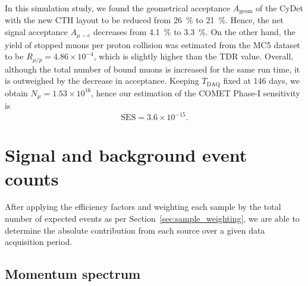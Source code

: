 In this simulation study, we found the geometrical acceptance $A_\mathrm{geom}$
of the CyDet with the new CTH layout to be reduced from \SI{26}{\percent} to
\SI{21}{\percent}. Hence, the net signal acceptance $A_{\mu-e}$ decreases from
\SI{4.1}{\percent} to \SI{3.3}{\percent}. On the other hand, the yield of
stopped muons per proton collision was estimated from the MC5 dataset to be
$R_{\mu / p} = 4.86 \times 10^{-4}$, which is slightly higher than the TDR
value. Overall, although the total number of bound muons is increased for the
same run time, it is outweighed by the decrease in acceptance. Keeping
$T_\mathrm{DAQ}$ fixed at 146 days, we obtain $N_\mu = 1.53 \times 10^{16}$,
hence our estimation of the COMET Phase\nobreakdash-I sensitivity is
\begin{equation}
\mathrm{SES} = 3.6 \times 10^{-15}.
\end{equation}


\section{Signal and background event counts}

After applying the efficiency factors and weighting each sample by the total
number of expected events as per Section~\ref{sec:sample_weighting}, we are able
to determine the absolute contribution from each source over a given data
acquisition period.

\subsection{Momentum spectrum}

